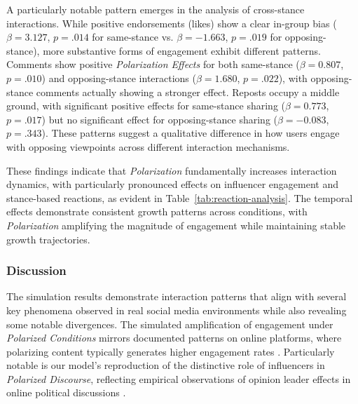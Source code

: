 A particularly notable pattern emerges in the analysis of cross-stance interactions. While positive endorsements (likes) show a clear in-group bias ($\beta = 3.127$, $p = .014$ for same-stance vs. $\beta = -1.663$, $p = .019$ for opposing-stance), more substantive forms of engagement exhibit different patterns. Comments show positive \emph{Polarization Effects} for both same-stance ($\beta = 0.807$, $p = .010$) and opposing-stance interactions ($\beta = 1.680$, $p = .022$), with opposing-stance comments actually showing a stronger effect. Reposts occupy a middle ground, with significant positive effects for same-stance sharing ($\beta = 0.773$, $p = .017$) but no significant effect for opposing-stance sharing ($\beta = -0.083$, $p = .343$). These patterns suggest a qualitative difference in how users engage with opposing viewpoints across different interaction mechanisms.

These findings indicate that \emph{Polarization} fundamentally increases interaction dynamics, with particularly pronounced effects on influencer engagement and stance-based reactions, as evident in Table~\ref{tab:reaction-analysis}. The temporal effects demonstrate consistent growth patterns across conditions, with \emph{Polarization} amplifying the magnitude of engagement while maintaining stable growth trajectories.

\subsubsection{Discussion}

The simulation results demonstrate interaction patterns that align with several key phenomena observed in real social media environments while also revealing some notable divergences. The simulated amplification of engagement under \emph{Polarized Conditions} mirrors documented patterns on online platforms, where polarizing content typically generates higher engagement rates \citep{simchon_troll_2022, horwitz_facebook_2020}. Particularly notable is our model's reproduction of the distinctive role of influencers in \emph{Polarized Discourse}, reflecting empirical observations of opinion leader effects in online political discussions \citep{soares_influencers_2018, dubois_multiple_2014}.



